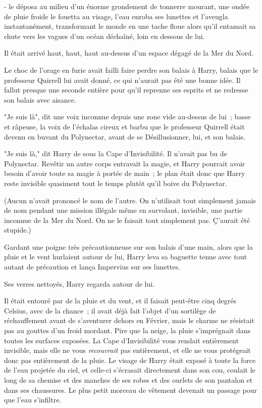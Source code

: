 - le déposa au milieu d'un énorme grondement de tonnerre mourant, une ondée de pluie froide le fouetta au visage, l'eau enroba ses lunettes et l'aveugla instantanément, transformant le monde en une tache floue alors qu'il entamait sa chute vers les vagues d'un océan déchaîné, loin en dessous de lui.

Il était arrivé haut, haut, haut au-dessus d'un espace dégagé de la Mer du Nord.

Le choc de l'orage en furie avait failli faire perdre son balais à Harry, balais que le professeur Quirrell lui avait donné, ce qui n'aurait pas été une bonne idée. Il fallut presque une seconde entière pour qu'il reprenne ses esprits et ne redresse son balais avec aisance.

"Je suis là", dit une voix inconnue depuis une zone vide au-dessus de lui~; basse et râpeuse, la voix de l'échalas cireux et barbu que le professeur Quirrell était devenu en buvant du Polynectar, avant de se Désillusionner, lui, et son balais.

"Je suis là," dit Harry de sous la Cape d'Invisibilité. Il n'avait pas bu de Polynectar. Revêtir un autre corps entravait la magie, et Harry pourrait avoir besoin d'avoir toute sa magie à portée de main~; le plan était donc que Harry reste invisible quasiment tout le temps plutôt qu'il boive du Polynectar.

(Aucun n'avait prononcé le nom de l'autre. On n'utilisait tout simplement jamais de nom pendant une mission illégale même en survolant, invisible, une partie inconnue de la Mer du Nord. On ne le faisait tout simplement pas. Ç'aurait été stupide.)

Gardant une poigne très précautionneuse sur son balais d'une main, alors que la pluie et le vent hurlaient autour de lui, Harry leva sa baguette tenue avec tout autant de précaution et lança Impervius sur ses lunettes.

Ses verres nettoyés, Harry regarda autour de lui.

Il était entouré par de la pluie et du vent, et il faisait peut-être cinq degrés Celsius, avec de la chance~; il avait déjà fait l'objet d'un sortilège de réchauffement avant de s'aventurer dehors en Février, mais le charme ne résistait pas au gouttes d'un froid mordant. Pire que la neige, la pluie s'imprégnait dans toutes les surfaces exposées. La Cape d'Invisibilité vous rendait entièrement invisible, mais elle ne vous \emph{recouvrait} pas entièrement, et elle ne vous protégeait donc pas entièrement de la pluie. Le visage de Harry était exposé à toute la force de l'eau projetée du ciel, et celle-ci s'écrasait directement dans son cou, coulait le long de sa chemise et des manches de ses robes et des ourlets de son pantalon et dans ses chaussures. Le plus petit morceau de vêtement devenait un passage pour que l'eau s'infiltre.

